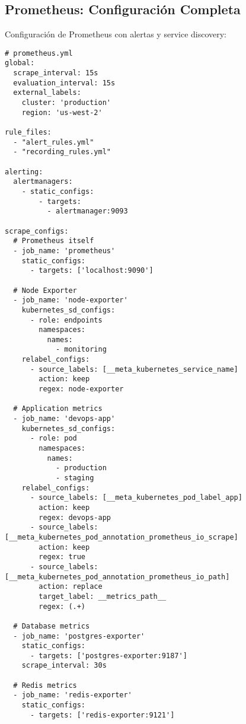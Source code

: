 \documentclass[12pt,a4paper]{article}
\begin{document}
\subsection{Prometheus: Configuración Completa}
Configuración de Prometheus con alertas y service discovery:
\begin{verbatim}
# prometheus.yml
global:
  scrape_interval: 15s
  evaluation_interval: 15s
  external_labels:
    cluster: 'production'
    region: 'us-west-2'

rule_files:
  - "alert_rules.yml"
  - "recording_rules.yml"

alerting:
  alertmanagers:
    - static_configs:
        - targets:
          - alertmanager:9093

scrape_configs:
  # Prometheus itself
  - job_name: 'prometheus'
    static_configs:
      - targets: ['localhost:9090']

  # Node Exporter
  - job_name: 'node-exporter'
    kubernetes_sd_configs:
      - role: endpoints
        namespaces:
          names:
            - monitoring
    relabel_configs:
      - source_labels: [__meta_kubernetes_service_name]
        action: keep
        regex: node-exporter

  # Application metrics
  - job_name: 'devops-app'
    kubernetes_sd_configs:
      - role: pod
        namespaces:
          names:
            - production
            - staging
    relabel_configs:
      - source_labels: [__meta_kubernetes_pod_label_app]
        action: keep
        regex: devops-app
      - source_labels: [__meta_kubernetes_pod_annotation_prometheus_io_scrape]
        action: keep
        regex: true
      - source_labels: [__meta_kubernetes_pod_annotation_prometheus_io_path]
        action: replace
        target_label: __metrics_path__
        regex: (.+)

  # Database metrics
  - job_name: 'postgres-exporter'
    static_configs:
      - targets: ['postgres-exporter:9187']
    scrape_interval: 30s

  # Redis metrics
  - job_name: 'redis-exporter'
    static_configs:
      - targets: ['redis-exporter:9121']
\end{verbatim}
\end{document}
